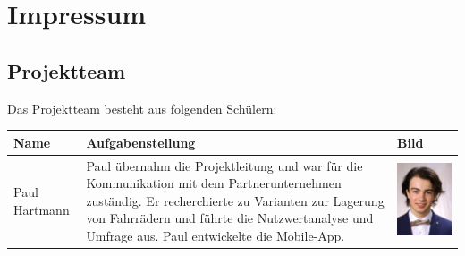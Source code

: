 \section{Impressum}
\subsection{Projektteam}
Das Projektteam besteht aus folgenden Schülern:\\

\begin{table}[H]
  \begin{center}
    \begin{tabular}{|p{}|p{}|p{}|}
      \hline
      \textbf{Name}  & \textbf{Aufgabenstellung}                                                                                                                                                                                                                                & \textbf{Bild}                                                                           \\
      \hline
      Paul Hartmann  & Paul übernahm die Projektleitung und war für die Kommunikation mit dem Partnerunternehmen zuständig. Er recherchierte zu Varianten zur Lagerung von Fahrrädern und führte die Nutzwertanalyse und Umfrage aus. Paul entwickelte die Mobile-App.          & \begin{minipage}{.3\textwidth} \includegraphics{images/paulhartmann.jpg} \end{minipage} \\
      \hline

\end{tabular}
\end{center}
\end{table}

